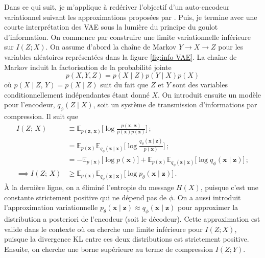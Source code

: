 Dans ce qui suit, je m'applique à redériver l'objectif d'un auto-encodeur variationnel suivant les approximations 
proposées par \citet{Alemi2017}. Puis, je termine avec une courte interprétation des VAE sous la lumière du principe du goulot d'information.
On commence par construire une limite variationnelle inférieure sur $I(Z; X)$. 
On assume d'abord la chaîne de Markov $Y \rightarrow X \rightarrow Z$ pour les variables 
aléatoires représentées dans la figure \ref{fig:info VAE}. La chaîne de Markov 
induit la factorisation de la probabilité jointe
\begin{equation}\label{eq:factorisation}
       p(X, Y, Z) = p(X \mid Z) p(Y \mid X) p(X) 
\end{equation} 
où $p(X \mid Z,\, Y) = p(X \mid Z)$ suit du fait que $Z$ et $Y$ sont des variables conditionnellement indépendantes étant donné $X$.
On introduit ensuite un modèle pour l'encodeur,
$q_\phi (Z \mid X)$, soit un système de transmission d'informations par compression. Il 
suit que 
\begin{align}
        I(Z;\, X) &\equiv \mathbb{E}_{p(\mathbf{z},\, \mathbf{x})} \bigg[\log \frac{p(\mathbf{x},\, \mathbf{z})}{p(\mathbf{x}) p(\mathbf{z})} \bigg]\, ;  \\[1.5ex]
        &= \mathbb{E}_{p(\mathbf{x})}\mathbb{E}_{q_\phi(\mathbf{z} \mid \mathbf{x})} \bigg[\log \frac{q_\phi(\mathbf{x} \mid \mathbf{z})}{p(\mathbf{x})} \bigg]\, ;  \\[1.5ex]
                &= -\mathbb{E}_{p(\mathbf{x})}\bigg[\log p(\mathbf{x}) \bigg]  
                + \mathbb{E}_{p(\mathbf{x})}\mathbb{E}_{q_\phi(\mathbf{z} \mid \mathbf{x})} \bigg[\log q_\phi(\mathbf{x} \mid \mathbf{z})\bigg]\, ;  \\[1.5ex]
                \label{eq:maximum info}
                \implies I(Z;\, X)&\geq \mathbb{E}_{p(\mathbf{x})}\mathbb{E}_{q_\phi(\mathbf{z} \mid \mathbf{x})} \bigg[\log p_\theta (\mathbf{x} \mid \mathbf{z})\bigg]\, .
\end{align}
À la dernière ligne, on a éliminé l'entropie du message $H(X)$, puisque c'est une constante strictement positive qui ne dépend pas de $\phi$.
On a aussi introduit l'approximation variationnelle $p_\theta (\mathbf{x} \mid \mathbf{z}) \approx q_\phi (\mathbf{x} \mid \mathbf{z})$ 
pour approximer la distribution a posteriori de l'encodeur (soit le décodeur). Cette approximation est valide dans le contexte où 
on cherche une limite inférieure pour $I(Z; X)$, puisque la divergence KL entre ces deux distributions est strictement positive.
Ensuite, on cherche une borne supérieure au terme de compression $I(Z; Y)$. 
